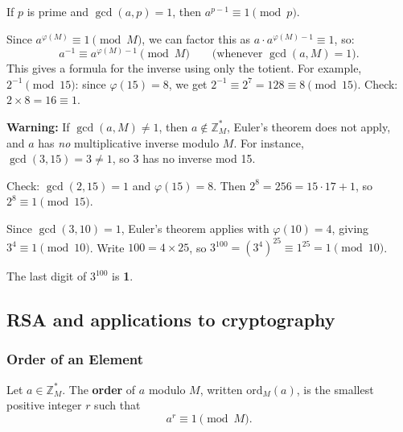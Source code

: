 \begin{corollary}
If $p$ is prime and $\gcd(a,p)=1$, then $a^{p-1} \equiv 1 \pmod{p}$.
\end{corollary}

\begin{remark}
Since $a^{\varphi(M)} \equiv 1 \pmod{M}$, we can factor this as $a \cdot a^{\varphi(M)-1} \equiv 1$, so:
\[
a^{-1} \equiv a^{\varphi(M)-1} \pmod{M} \qquad \text{(whenever } \gcd(a,M)=1\text{)}.
\]
This gives a formula for the inverse using only the totient. For example, $2^{-1} \pmod{15}$: since $\varphi(15)=8$, we get $2^{-1} \equiv 2^7 = 128 \equiv 8 \pmod{15}$. Check: $2 \times 8 = 16 \equiv 1$. \checkmark

\textbf{Warning:} If $\gcd(a,M) \neq 1$, then $a \notin \mathbb{Z}_M^*$, Euler's theorem does not apply, and $a$ has \emph{no} multiplicative inverse modulo $M$. For instance, $\gcd(3,15)=3 \neq 1$, so 3 has no inverse mod 15.
\end{remark}

\begin{example}[Euler's theorem verification: $a=2$, $M=15$]
Check: $\gcd(2,15)=1$ and $\varphi(15)=8$. Then $2^8 = 256 = 15 \cdot 17 + 1$, so $2^8 \equiv 1 \pmod{15}$. \checkmark
\end{example}

\begin{example}
Since $\gcd(3,10)=1$, Euler's theorem applies with $\varphi(10)=4$, giving $3^4 \equiv 1 \pmod{10}$.
Write $100 = 4 \times 25$, so $3^{100} = (3^4)^{25} \equiv 1^{25} = 1 \pmod{10}$.

The last digit of $3^{100}$ is \textbf{1}.
\end{example}

\subsection{RSA and applications to cryptography}

\subsubsection*{Order of an Element}

\begin{definition}
Let $a \in \mathbb{Z}_M^*$. The \textbf{order} of $a$ modulo $M$, written $\mathrm{ord}_M(a)$, is the smallest positive integer $r$ such that
\[
a^r \equiv 1 \pmod{M}.
\]
\end{definition}

